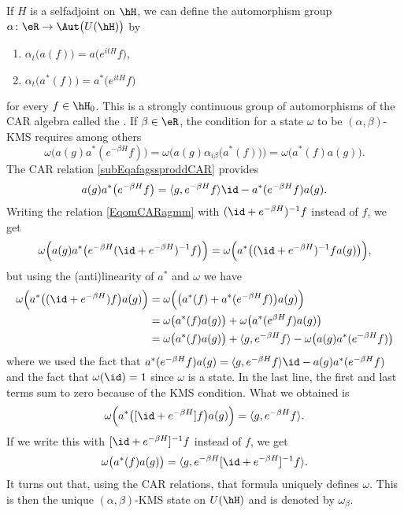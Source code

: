 If $H$ is a selfadjoint on $\hH$, we can define the automorphism group $\alpha\colon \eR\to \Aut\big( U(\hH) \big)$ by
\begin{enumerate}
	\item
		$\alpha_t\big( a(f) \big)=a\big(  e^{itH}f \big)$,
	\item
		$\alpha_t\big( a^*(f) \big)=a^*\big(  e^{itH}f \big)$
\end{enumerate}
for every $f\in\hH_0$. This is a strongly continuous group of automorphisms of the CAR algebra called the . If $\beta\in\eR$, the condition for a state $\omega$ to be $(\alpha,\beta)$-KMS requires among others
\begin{equation}		\label{EqomCARagmm}
	\omega\big( a(g)a^*( e^{-\beta H}f) \big)=\omega\Big( a(g)\alpha_{i\beta}\big( a^*(f) \big) \Big)=\omega\big( a^*(f)a(g) \big).
\end{equation}
The CAR relation \eqref{subEqafagssproddCAR} provides
\begin{equation}
	a(g)a^*\big(  e^{-\beta H}f \big)=\langle g,  e^{-\beta H}f\rangle \id-a^*( e^{-\beta  H}f)a(g).
\end{equation}
Writing the relation \eqref{EqomCARagmm} with $(\id+ e^{-\beta H})^{-1}f$ instead of $f$, we get
\begin{equation}
	\omega\Big( a(g)a^*\big(  e^{-\beta H}(\id+ e^{-\beta H})^{-1}f \big) \Big)=\omega\Big( a^*\big( (\id+ e^{-\beta H})^{-1}fa(g) \big) \Big),
\end{equation}
but using the (anti)linearity of $a^*$ and $\omega$ we have
\begin{equation}
	\begin{aligned}[]
		\omega\Big( a^*\big( (\id+ e^{-\beta H})f \big)a(g) \Big)&=\omega\Big( \big( a^*(f)+a^*( e^{-\beta H}f) \big)a(g) \Big)\\
		&=\omega\big( a^*(f)a(g) \big)+\omega\big( a^*( e^{\beta H}f)a(g) \big)\\
		&=\omega\big( a^*(f)a(g) \big)+\langle g,  e^{-\beta H}f\rangle -\omega\big( a(g)a^*( e^{-\beta H}f) \big)
	\end{aligned}
\end{equation}
where we used the fact that $a^*( e^{-\beta H}f)a(g)=\langle g,  e^{-\beta H}f\rangle \id-a(g)a^*( e^{-\beta H}f)$ and the fact that $\omega(\id)=1$ since $\omega$ is a state. In the last line, the first and last terms sum to zero because of the KMS condition. What we obtained is
\begin{equation}
	\omega\Big( a^*\big( [\id+ e^{-\beta H}]f\big)a(g) \Big)=\langle g,  e^{-\beta H}f\rangle .
\end{equation}
If we write this with $[\id+ e^{-\beta H}]^{-1}f$ instead of $f$, we get
\begin{equation}
	\omega\big( a^*(f)a(g) \big)=\langle g,   e^{-\beta H}[\id+ e^{-\beta H}]^{-1}f \rangle .
\end{equation}
It turns out that, using the CAR relations, that formula uniquely defines $\omega$. This is then the unique $(\alpha,\beta)$-KMS state on $U(\hH)$ and is denoted by $\omega_{\beta}$.


